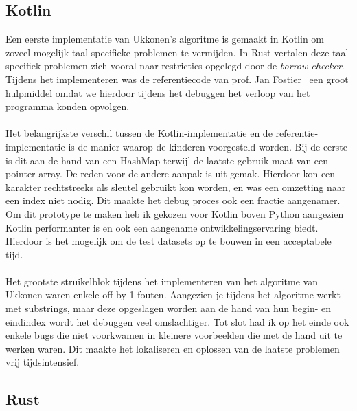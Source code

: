 \subsection{Kotlin}\label{subsec:kotlin}
Een eerste implementatie van Ukkonen's algoritme is gemaakt in Kotlin om zoveel mogelijk taal-specifieke problemen te vermijden.
In Rust vertalen deze taal-specifiek problemen zich vooral naar restricties opgelegd door de \textit{borrow checker}.
Tijdens het implementeren was de referentiecode van prof. Jan Fostier~\cite{Ukkonen_CCB} een groot hulpmiddel omdat we hierdoor tijdens het debuggen het verloop van het programma konden opvolgen.
\\ \\
Het belangrijkste verschil tussen de Kotlin-implementatie en de referentie-implementatie is de manier waarop de kinderen voorgesteld worden.
Bij de eerste is dit aan de hand van een HashMap terwijl de laatste gebruik maat van een pointer array.
De reden voor de andere aanpak is uit gemak.
Hierdoor kon een karakter rechtstreeks als sleutel gebruikt kon worden, en was een omzetting naar een index niet nodig.
Dit maakte het debug proces ook een fractie aangenamer.
Om dit prototype te maken heb ik gekozen voor Kotlin boven Python aangezien Kotlin performanter is en ook een aangename ontwikkelingservaring biedt.
Hierdoor is het mogelijk om de test datasets op te bouwen in een acceptabele tijd.
\\ \\
Het grootste struikelblok tijdens het implementeren van het algoritme van Ukkonen waren enkele off-by-1 fouten.
Aangezien je tijdens het algoritme werkt met substrings, maar deze opgeslagen worden aan de hand van hun begin- en eindindex wordt het debuggen veel omslachtiger.
Tot slot had ik op het einde ook enkele bugs die niet voorkwamen in kleinere voorbeelden die met de hand uit te werken waren.
Dit maakte het lokaliseren en oplossen van de laatste problemen vrij tijdsintensief.

\subsection{Rust}\label{subsec:rust}

